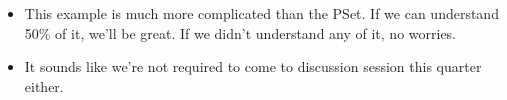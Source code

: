 \documentclass[../notes.tex]{subfiles}
\begin{document}
\begin{itemize}
\begin{proof}
\begin{align*}
            &= \frac{(-i\hbar)^n}{2\pi}\int_{-\infty}^\infty\dd{x}\int_{-\infty}^\infty\dd{k}\int_{-\infty}^\infty\dd{\ell}\e[-ikx]\tilde{\psi}^*(k)\tilde{\psi}(\ell)\pdv[n]{x}(\e[i\ell x])\\
            &= \frac{(-i\hbar)^n}{2\pi}\int_{-\infty}^\infty\dd{x}\dd{k}\dd{\ell}\e[-ikx]\tilde{\psi}^*(k)\tilde{\psi}(\ell)(i\ell)^n\e[i\ell x]\\
            &= \int_{-\infty}^\infty\dd{k}\int_{-\infty}^\infty\dd{\ell}\tilde{\psi}^*(k)\tilde{\psi}(\ell)(\ell\hbar)^n\underbrace{\frac{1}{2\pi}\int_{-\infty}^\infty\dd{x}\e[i(\ell-k)x]}_{\tilde{\delta}(\ell-k)}\\
            &= \int_{-\infty}^\infty\dd{k}\tilde{\psi}^*(k)\tilde{\psi}(\ell)(\ell\hbar)^n\eval{}_{\ell=k}\\
            &= \int_{-\infty}^\infty\dd{k}\tilde{\psi}^*(k)\tilde{\psi}(k)(k\hbar)^n\\
            &= \sum_{n=0}^\infty\frac{1}{n!}\eval{\pdv[n]{f}{p}}_{p=0}\int_{-\infty}^\infty\dd{k}(k\hbar)^n|\tilde{\psi}(k)|^2\\
            &= \int_{-\infty}^\infty\dd{k}|\tilde{\psi}(k)|^2\underbrace{\sum_{n=0}^\infty\frac{1}{n!}\eval{\pdv[n]{f}{p}}_{p=0}(k\hbar)^n}_{f(k\hbar)}\\
            &= \int_{-\infty}^\infty\dd{k}|\tilde{\psi}(k)|^2f(k\hbar)
        \end{align*}
    \end{proof}
    \item This example is much more complicated than the PSet. If we can understand 50\% of it, we'll be great. If we didn't understand any of it, no worries.
    \item It sounds like we're not required to come to discussion session this quarter either.
\end{itemize}
\end{document}
